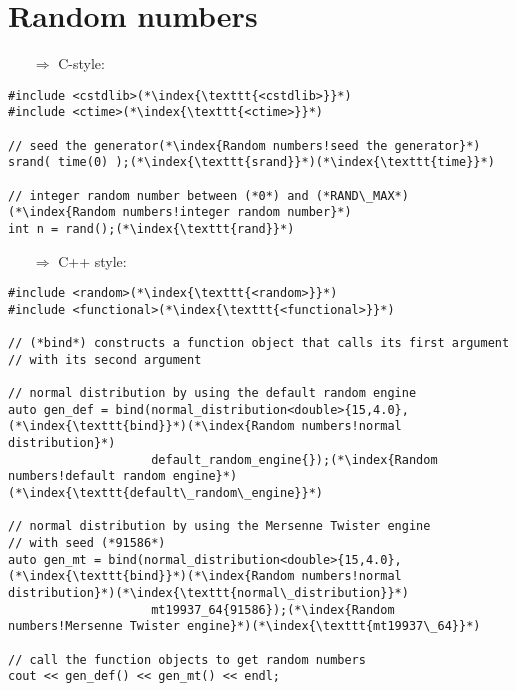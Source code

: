 \documentclass[10pt]{article}
\begin{document}
\section{Random numbers}
\small
\begin{enumerate}
\item[$\Rightarrow$] C-style:
\end{enumerate}
\begin{lstlisting}
#include <cstdlib>(*\index{\texttt{<cstdlib>}}*)
#include <ctime>(*\index{\texttt{<ctime>}}*)

// seed the generator(*\index{Random numbers!seed the generator}*)
srand( time(0) );(*\index{\texttt{srand}}*)(*\index{\texttt{time}}*)

// integer random number between (*0*) and (*RAND\_MAX*)(*\index{Random numbers!integer random number}*)
int n = rand();(*\index{\texttt{rand}}*)
\end{lstlisting}
\begin{enumerate}
\item[$\Rightarrow$] C++ style:
\end{enumerate}
\begin{lstlisting}
#include <random>(*\index{\texttt{<random>}}*)
#include <functional>(*\index{\texttt{<functional>}}*)

// (*bind*) constructs a function object that calls its first argument
// with its second argument

// normal distribution by using the default random engine
auto gen_def = bind(normal_distribution<double>{15,4.0},(*\index{\texttt{bind}}*)(*\index{Random numbers!normal distribution}*)
                    default_random_engine{});(*\index{Random numbers!default random engine}*)(*\index{\texttt{default\_random\_engine}}*)
                    
// normal distribution by using the Mersenne Twister engine
// with seed (*91586*)                  
auto gen_mt = bind(normal_distribution<double>{15,4.0},(*\index{\texttt{bind}}*)(*\index{Random numbers!normal distribution}*)(*\index{\texttt{normal\_distribution}}*)
                    mt19937_64{91586});(*\index{Random numbers!Mersenne Twister engine}*)(*\index{\texttt{mt19937\_64}}*)

// call the function objects to get random numbers
cout << gen_def() << gen_mt() << endl;
\end{lstlisting}
%
%
\end{document}

